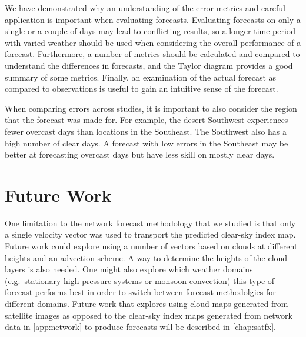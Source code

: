We have demonstrated why an understanding of the error metrics and
careful application is important when evaluating forecasts.
Evaluating forecasts on only a single or a couple of days may lead to
conflicting results, so a longer time period with varied weather
should be used when considering the overall performance of a forecast.
Furthermore, a number of metrics should be calculated and compared to
 understand the differences in forecasts, and the Taylor diagram
provides a good summary of some metrics.
Finally, an examination of the actual forecast as compared to
observations is useful to gain an intuitive sense of the forecast.

When comparing errors across studies, it is important to also consider
the region that the forecast was made for.
For example, the desert Southwest experiences fewer overcast days than
locations in the Southeast.
The Southwest also has a high number of clear days.
A forecast with low errors in the Southeast may be better at
forecasting overcast days but have less skill on mostly clear days.

\section{Future Work}
One limitation to the network forecast methodology that we studied is
that only a single velocity vector was used to transport the predicted
clear-sky index map.
Future work could explore using a number of vectors based on clouds at
different heights and an advection scheme.
A way to determine the heights of the cloud layers is also needed.
One might also explore which weather domains (e.g.~stationary high
pressure systems or monsoon convection) this type of forecast performs
best in order to switch between forecast methodolgies for different
domains.
Future work that explores using cloud maps generated from satellite
images as opposed to the clear-sky index maps generated from network
data in \cref{app:network} to produce forecasts will be described in
\cref{chap:satfx}.


